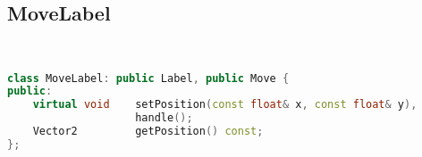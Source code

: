 \subsection{MoveLabel}
\begin{lstlisting}[language=C++]


class MoveLabel: public Label, public Move {
public:
    virtual void    setPosition(const float& x, const float& y),
                    handle();
    Vector2         getPosition() const;
};






\end{lstlisting}
